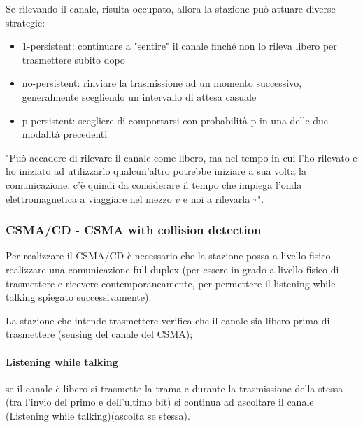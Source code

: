 Se rilevando il canale, risulta occupato, allora la stazione può attuare diverse strategie: 
\begin{itemize}
    \item 1-persistent:  continuare a "sentire" il canale finché non lo rileva libero per trasmettere subito dopo
    \item no-persistent: rinviare la trasmissione ad un momento successivo, generalmente scegliendo un intervallo di attesa casuale
    \item p-persistent: scegliere di comportarsi con probabilità p in una delle due modalità precedenti
\end{itemize}
"Può accadere di rilevare il canale come libero, ma nel tempo in cui l'ho rilevato e ho iniziato ad utilizzarlo qualcun'altro potrebbe iniziare a sua volta la comunicazione, c'è quindi da considerare il tempo che impiega l'onda elettromagnetica a viaggiare nel mezzo $v$ e noi a rilevarla $\tau$".

\subsubsection{CSMA/CD - CSMA with collision detection}
Per realizzare il CSMA/CD è necessario che la stazione possa a livello fisico
realizzare una comunicazione full duplex (per essere in grado a livello fisico di
trasmettere e ricevere contemporaneamente, per permettere il listening while talking spiegato successivamente).

La stazione che intende trasmettere verifica che il canale sia libero prima di
trasmettere (sensing del canale del CSMA); 
\paragraph{Listening while talking}
se il canale è libero si trasmette la trama e durante la trasmissione della stessa
(tra l'invio del primo e dell'ultimo bit) si continua ad ascoltare il canale (Listening
while talking)(ascolta se stessa).



